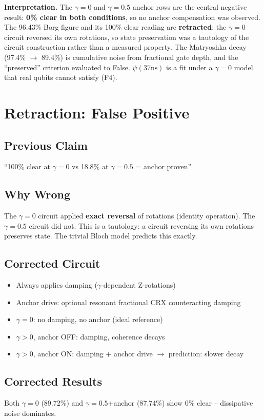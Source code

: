 \documentclass[11pt,a4paper]{article}
\begin{document}
\textbf{Interpretation.} The $\gamma=0$ and $\gamma=0.5$ anchor rows are the
central negative result: \textbf{0\% clear in both conditions}, so no anchor
compensation was observed. The 96.43\% Borg figure and its 100\% clear reading
are \textbf{retracted}: the $\gamma=0$ circuit reversed its own rotations, so
state preservation was a tautology of the circuit construction rather than a
measured property. The Matryoshka decay (97.4\% $\to$ 89.4\%) is cumulative
noise from fractional gate depth, and the ``preserved'' criterion evaluated to
False. $\psi(37\text{ns})$ is a fit under a $\gamma=0$ model that real qubits
cannot satisfy (F4).

\section{Retraction: False Positive}

\subsection{Previous Claim}
``100\% clear at $\gamma=0$ vs 18.8\% at $\gamma=0.5$ = anchor proven''

\subsection{Why Wrong}
The $\gamma=0$ circuit applied \textbf{exact reversal} of rotations (identity operation). The $\gamma=0.5$ circuit did not. This is a tautology: a circuit reversing its own rotations preserves state. The trivial Bloch model predicts this exactly.

\subsection{Corrected Circuit}
\begin{itemize}
\item Always applies damping ($\gamma$-dependent Z-rotations)
\item Anchor drive: optional resonant fractional CRX counteracting damping
\item $\gamma=0$: no damping, no anchor (ideal reference)
\item $\gamma>0$, anchor OFF: damping, coherence decays
\item $\gamma>0$, anchor ON: damping + anchor drive $\to$ prediction: slower decay
\end{itemize}

\subsection{Corrected Results}
Both $\gamma=0$ (89.72\%) and $\gamma=0.5$+anchor (87.74\%) show 0\% clear -- dissipative noise dominates.
\end{document}
